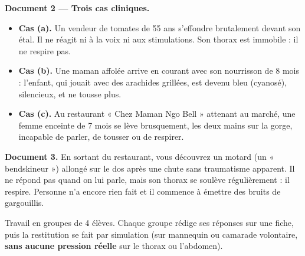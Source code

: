 \documentclass[11pt]{article}
\newcounter{popsec}
\newcounter{popsub}
\newcommand{\courssub}[1]{%
  \stepcounter{popsub}%
  \par\vspace{9pt}\noindent{\popxbold\fontsize{11.5}{13}\selectfont\color{popink}{\color{poporange}\thepopsec.\thepopsub}\hspace{6pt}#1}\par\nopagebreak\vspace{4pt}
}
\begin{document}
\textbf{Document 2 — Trois cas cliniques.}
\begin{itemize}
\item \textbf{Cas (a).} Un vendeur de tomates de 55 ans s'effondre brutalement devant son étal. Il ne réagit ni à la voix ni aux stimulations. Son thorax est immobile : il ne respire pas.
\item \textbf{Cas (b).} Une maman affolée arrive en courant avec son nourrisson de 8 mois : l'enfant, qui jouait avec des arachides grillées, est devenu bleu (cyanosé), silencieux, et ne tousse plus.
\item \textbf{Cas (c).} Au restaurant « Chez Maman Ngo Bell » attenant au marché, une femme enceinte de 7 mois se lève brusquement, les deux mains sur la gorge, incapable de parler, de tousser ou de respirer.
\end{itemize}

\textbf{Document 3.} En sortant du restaurant, vous découvrez un motard (un « bendskineur ») allongé sur le dos après une chute sans traumatisme apparent. Il ne répond pas quand on lui parle, mais son thorax se soulève régulièrement : il respire. Personne n'a encore rien fait et il commence à émettre des bruits de gargouillis.

\courssub{Consignes}

Travail en groupes de 4 élèves. Chaque groupe rédige ses réponses sur une fiche, puis la restitution se fait par simulation (sur mannequin ou camarade volontaire, \textbf{sans aucune pression réelle} sur le thorax ou l'abdomen).
\end{document}
